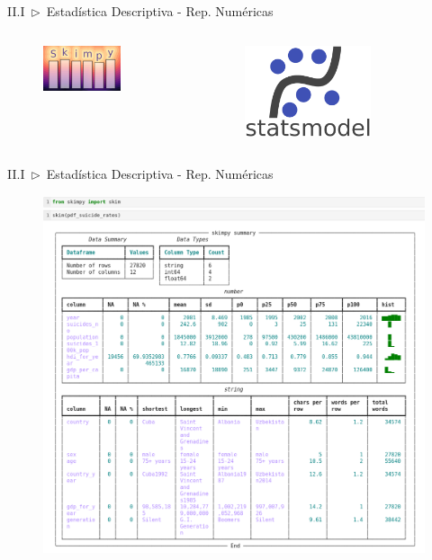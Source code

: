 \documentclass[xcolor=dvipsnames]{beamer}
\begin{document}
    \begin{frame}{II.I~$\rhd$~Estadística Descriptiva - Rep. Numéricas}
        \begin{columns}
                \begin{figure}
                \centering
                \includegraphics[width=0.7\textwidth]{imgs/logos/skimpy_logo.png}
                \end{figure}
                \begin{figure}
                \centering
                \includegraphics[width=0.7\textwidth]{imgs/logos/statsmodels-logo-v2.png}
                \end{figure}
        \end{columns}
    \end{frame}

    \begin{frame}{II.I~$\rhd$~Estadística Descriptiva - Rep. Numéricas}
        \begin{figure}
            \centering
            \includegraphics[width=0.7\linewidth]{imgs/t1_img2.png}
        \end{figure}
    \end{frame}
\end{document}
